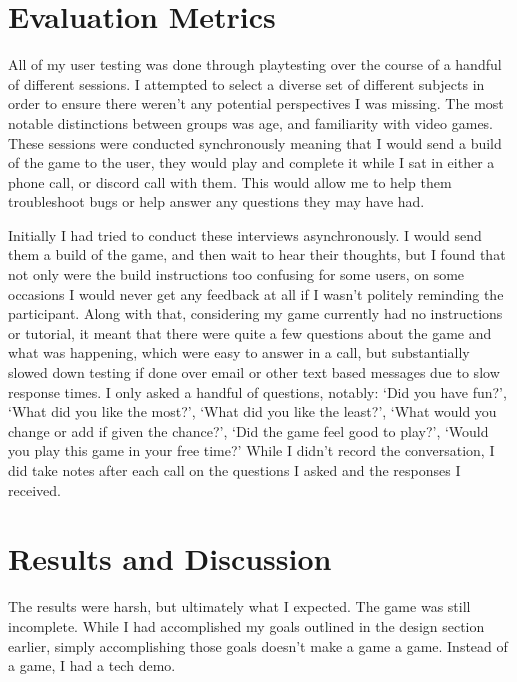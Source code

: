 \documentclass[10pt,twocolumn]{article}
\begin{document}
\section{Evaluation Metrics}
All of my user testing was done through playtesting over the course of a handful of different sessions. I attempted to select a diverse set of different subjects in order to ensure there weren’t any potential perspectives I was missing. The most notable distinctions between groups was age, and familiarity with video games. These sessions were conducted synchronously meaning that I would send a build of the game to the user, they would play and complete it while I sat in either a phone call, or discord call with them. This would allow me to help them troubleshoot bugs or help answer any questions they may have had.

Initially I had tried to conduct these interviews asynchronously. I would send them a build of the game, and then wait to hear their thoughts, but I found that not only were the build instructions too confusing for some users, on some occasions I would never get any feedback at all if I wasn’t politely reminding the participant. Along with that, considering my game currently had no instructions or tutorial, it meant that there were quite a few questions about the game and what was happening, which were easy to answer in a call, but substantially slowed down testing if done over email or other text based messages due to slow response times. I only asked a handful of questions, notably: ‘Did you have fun?’, ‘What did you like the most?’, ‘What did you like the least?’, ‘What would you change or add if given the chance?’, ‘Did the game feel good to play?’, ‘Would you play this game in your free time?’
While I didn’t record the conversation, I did take notes after each call on the questions I asked and the responses I received.

\section{Results and Discussion}
The results were harsh, but ultimately what I expected. The game was still incomplete. While I had accomplished my goals outlined in the design section earlier, simply accomplishing those goals doesn't make a game a game. Instead of a game, I had a tech demo. 
\end{document}
